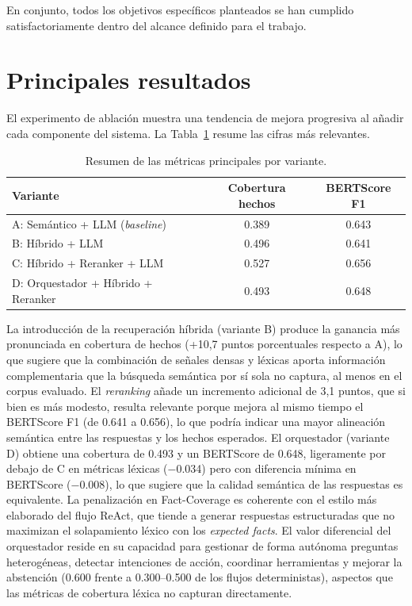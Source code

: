 En conjunto, todos los objetivos específicos planteados se han cumplido satisfactoriamente dentro del alcance definido para el trabajo.

\section{Principales resultados}\label{sec:principales-resultados}

El experimento de ablación muestra una tendencia de mejora progresiva al añadir cada componente del sistema. 
La Tabla~\ref{tab:resultados-conclusiones} resume las cifras más relevantes.

\begin{table}[H]
\centering
\begin{tabular}{lcc}
\toprule
\textbf{Variante} & \textbf{Cobertura hechos} & \textbf{BERTScore F1} \\
\midrule
A: Semántico + LLM (\textit{baseline}) & 0.389 & 0.643 \\
B: Híbrido + LLM                       & 0.496 & 0.641 \\
C: Híbrido + Reranker + LLM            & 0.527 & 0.656 \\
D: Orquestador + Híbrido + Reranker    & 0.493 & 0.648 \\
\bottomrule
\end{tabular}
\caption{Resumen de las métricas principales por variante.}
\label{tab:resultados-conclusiones}
\end{table}

La introducción de la recuperación híbrida (variante B) produce la ganancia más pronunciada en cobertura de hechos (+10,7 puntos porcentuales respecto a A), lo que sugiere que la combinación de señales densas y léxicas aporta información complementaria que la búsqueda semántica por sí sola no captura, al menos en el corpus evaluado. 
El \textit{reranking} añade un incremento adicional de 3,1 puntos, que si bien es más modesto, resulta relevante porque mejora al mismo tiempo el BERTScore F1 (de 0.641 a 0.656), lo que podría indicar una mayor alineación semántica entre las respuestas y los hechos esperados. 
El orquestador (variante D) obtiene una cobertura de 0.493 y un BERTScore de 0.648, ligeramente por debajo de C en métricas léxicas ($-$0.034) pero con diferencia mínima en BERTScore ($-$0.008), lo que sugiere que la calidad semántica de las respuestas es equivalente.
La penalización en Fact-Coverage es coherente con el estilo más elaborado del flujo ReAct, que tiende a generar respuestas estructuradas que no maximizan el solapamiento léxico con los \textit{expected facts}.
El valor diferencial del orquestador reside en su capacidad para gestionar de forma autónoma preguntas heterogéneas, detectar intenciones de acción, coordinar herramientas y mejorar la abstención (0.600 frente a 0.300--0.500 de los flujos deterministas), aspectos que las métricas de cobertura léxica no capturan directamente.

